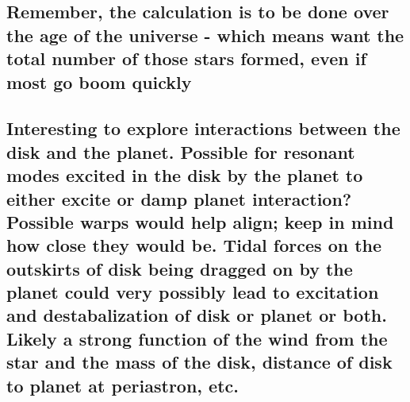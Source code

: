 \subsection{Remember, the calculation is to be done over the age of the universe - which means want the total number of those stars formed, even if most go boom quickly} 


\subsection{Interesting to explore interactions between the disk and
the planet.  Possible for resonant modes excited in the disk by the
planet to either excite or damp planet interaction? Possible warps
would help align; keep in mind how close they would be.  Tidal
forces on the outskirts of disk being dragged on by the planet could
very possibly lead to excitation and destabalization of disk or
planet or both.  Likely a strong function of the wind from the star
and the mass of the disk, distance of disk to planet at periastron,
etc.}
